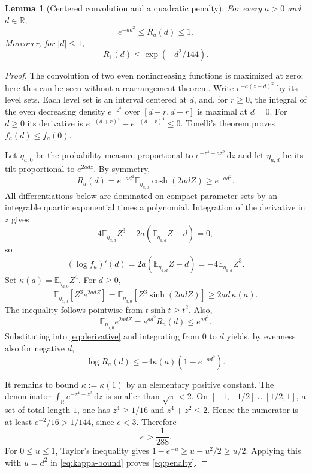 \documentclass[11pt]{article}
\newtheorem{lemma}[theorem]{Lemma}
\theoremstyle{remark}
\newcommand{\E}{\mathbb E}
\newcommand{\R}{\mathbb R}
\newcommand{\dd}{\,\mathrm d}
\begin{document}
\begin{lemma}[Centered convolution and a quadratic penalty]\label{lem:oned}
For every $a>0$ and $d\in\R$,
\begin{equation}\label{eq:universal}
e^{-ad^2}\le R_a(d)\le1.
\end{equation}
Moreover, for $|d|\le1$,
\begin{equation}\label{eq:penalty}
R_1(d)\le\exp(-d^2/144).
\end{equation}
\end{lemma}
\begin{proof}
The convolution of two even nonincreasing functions is maximized at zero; here this can be seen without a rearrangement theorem. Write $e^{-a(z-d)^2}$ by its level sets. Each level set is an interval centered at $d$, and, for $r\ge0$, the integral of the even decreasing density $e^{-z^4}$ over $[d-r,d+r]$ is maximal at $d=0$. For $d\ge0$ its derivative is
$e^{-(d+r)^4}-e^{-(d-r)^4}\le0$. Tonelli's theorem proves $f_a(d)\le f_a(0)$.

Let $\eta_{a,0}$ be the probability measure proportional to $e^{-z^4-az^2}\dd z$ and let $\eta_{a,d}$ be its tilt proportional to $e^{2adz}$. By symmetry,
\begin{equation}\label{eq:cosh}
R_a(d)=e^{-ad^2}\E_{\eta_{a,0}}\cosh(2adZ)\ge e^{-ad^2}.
\end{equation}
All differentiations below are dominated on compact parameter sets by an integrable quartic exponential times a polynomial. Integration of the derivative in $z$ gives
\[
4\E_{\eta_{a,d}}Z^3+2a(\E_{\eta_{a,d}}Z-d)=0,
\]
so
\begin{equation}\label{eq:derivative}
(\log f_a)'(d)
=2a(\E_{\eta_{a,d}}Z-d)=-4\E_{\eta_{a,d}}Z^3.
\end{equation}
Set $\kappa(a)=\E_{\eta_{a,0}} Z^4$. For $d\ge0$,
\[
\E_{\eta_{a,0}}[Z^3 e^{2adZ}]
=\E_{\eta_{a,0}}[Z^3\sinh(2adZ)]\ge2ad\,\kappa(a).
\]
The inequality follows pointwise from $t\sinh t\ge t^2$. Also,
\[
\E_{\eta_{a,0}}e^{2adZ}=e^{ad^2}R_a(d)\le e^{ad^2}.
\]
Substituting into \eqref{eq:derivative} and integrating from $0$ to $d$ yields, by evenness also for negative $d$,
\begin{equation}\label{eq:kappa-bound}
\log R_a(d)\le-4\kappa(a)(1-e^{-ad^2}).
\end{equation}

It remains to bound $\kappa:=\kappa(1)$ by an elementary positive constant.
The denominator $\int_\R e^{-z^4-z^2}\dd z$ is smaller than $\sqrt\pi<2$.
On $[-1,-1/2]\cup[1/2,1]$, a set of total length $1$, one has $z^4\ge1/16$ and $z^4+z^2\le2$. Hence the numerator is at least $e^{-2}/16>1/144$, since $e<3$. Therefore
\begin{equation}\label{eq:kappa-elementary}
\kappa>\frac1{288}.
\end{equation}
For $0\le u\le1$, Taylor's inequality gives
$1-e^{-u}\ge u-u^2/2\ge u/2$.
Applying this with $u=d^2$ in \eqref{eq:kappa-bound} proves \eqref{eq:penalty}.
\end{proof}
\end{document}
